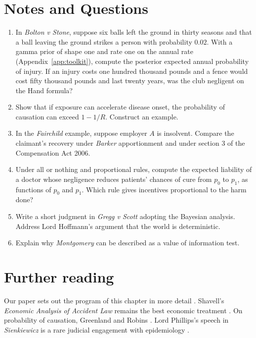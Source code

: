 \section*{Notes and Questions}
\begin{enumerate}[label=\arabic*.]
\item In \emph{Bolton v Stone}, suppose six balls left the ground in thirty seasons and that a ball leaving the ground strikes a person with probability $0.02$. With a gamma prior of shape one and rate one on the annual rate (Appendix~\ref{app:toolkit}), compute the posterior expected annual probability of injury. If an injury costs one hundred thousand pounds and a fence would cost fifty thousand pounds and last twenty years, was the club negligent on the Hand formula?
\item Show that if exposure can accelerate disease onset, the probability of causation can exceed $1 - 1/R$. Construct an example.
\item In the \emph{Fairchild} example, suppose employer $A$ is insolvent. Compare the claimant's recovery under \emph{Barker} apportionment and under section 3 of the Compensation Act 2006.
\item Under all or nothing and proportional rules, compute the expected liability of a doctor whose negligence reduces patients' chances of cure from $p_0$ to $p_1$, as functions of $p_0$ and $p_1$. Which rule gives incentives proportional to the harm done?
\item Write a short judgment in \emph{Gregg v Scott} adopting the Bayesian analysis. Address Lord Hoffmann's argument that the world is deterministic.
\item Explain why \emph{Montgomery} can be described as a value of information test.
\end{enumerate}

\section*{Further reading}
Our paper sets out the program of this chapter in more detail \citep{polson_sokolov_tort}. Shavell's \emph{Economic Analysis of Accident Law} remains the best economic treatment \citep{shavell1987}. On probability of causation, Greenland and Robins \citep{greenland1999}. Lord Phillips's speech in \emph{Sienkiewicz} is a rare judicial engagement with epidemiology \citep{sienkiewicz2011}.
